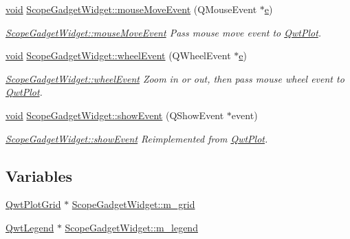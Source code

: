 \begin{DoxyCompactItemize}
\hyperlink{group___u_a_v_objects_plugin_ga444cf2ff3f0ecbe028adce838d373f5c}{void} \hyperlink{group__scopeplugin_ga3a4b3097cd04ab00ad3bbdd290186696}{Scope\-Gadget\-Widget\-::mouse\-Move\-Event} (Q\-Mouse\-Event $\ast$\hyperlink{_o_p_plots_8m_a9425be9aab51621e317ba7ade564b570}{e})
\begin{DoxyCompactList}\small\item\em \hyperlink{group__scopeplugin_ga3a4b3097cd04ab00ad3bbdd290186696}{Scope\-Gadget\-Widget\-::mouse\-Move\-Event} Pass mouse move event to \hyperlink{class_qwt_plot}{Qwt\-Plot}. \end{DoxyCompactList}\item 
\hyperlink{group___u_a_v_objects_plugin_ga444cf2ff3f0ecbe028adce838d373f5c}{void} \hyperlink{group__scopeplugin_ga1cf4485edf803c91fec9d29e6f33dfd8}{Scope\-Gadget\-Widget\-::wheel\-Event} (Q\-Wheel\-Event $\ast$\hyperlink{_o_p_plots_8m_a9425be9aab51621e317ba7ade564b570}{e})
\begin{DoxyCompactList}\small\item\em \hyperlink{group__scopeplugin_ga1cf4485edf803c91fec9d29e6f33dfd8}{Scope\-Gadget\-Widget\-::wheel\-Event} Zoom in or out, then pass mouse wheel event to \hyperlink{class_qwt_plot}{Qwt\-Plot}. \end{DoxyCompactList}\item 
\hyperlink{group___u_a_v_objects_plugin_ga444cf2ff3f0ecbe028adce838d373f5c}{void} \hyperlink{group__scopeplugin_ga323510a973ec27e6c976ec2748cfcaa6}{Scope\-Gadget\-Widget\-::show\-Event} (Q\-Show\-Event $\ast$event)
\begin{DoxyCompactList}\small\item\em \hyperlink{group__scopeplugin_ga323510a973ec27e6c976ec2748cfcaa6}{Scope\-Gadget\-Widget\-::show\-Event} Reimplemented from \hyperlink{class_qwt_plot}{Qwt\-Plot}. \end{DoxyCompactList}\end{DoxyCompactItemize}
\subsection*{Variables}
\begin{DoxyCompactItemize}
\item 
\hyperlink{class_qwt_plot_grid}{Qwt\-Plot\-Grid} $\ast$ \hyperlink{group__scopeplugin_gaccb00d0e9720797980ac9f03c545e756}{Scope\-Gadget\-Widget\-::m\-\_\-grid}
\item 
\hyperlink{class_qwt_legend}{Qwt\-Legend} $\ast$ \hyperlink{group__scopeplugin_ga2ee6ef41538d48a8d6f653765bcb80a6}{Scope\-Gadget\-Widget\-::m\-\_\-legend}
\end{DoxyCompactItemize}



